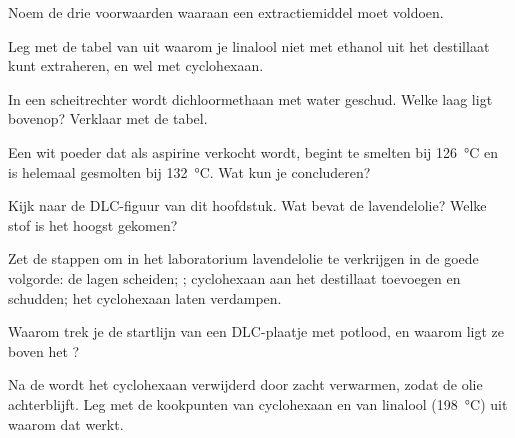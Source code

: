 \begin{exercise}[$\star$]\label{exo:g10:chemical-species:5}
Noem de drie voorwaarden waaraan een extractiemiddel moet voldoen.
\end{exercise}

\begin{exercise}[$\star\star$]\label{exo:g10:chemical-species:6}
Leg met de tabel van  uit waarom je linalool niet met
ethanol uit het destillaat kunt extraheren, en wel met cyclohexaan.
\end{exercise}

\begin{exercise}[$\star\star$]\label{exo:g10:chemical-species:7}
In een scheitrechter wordt dichloormethaan met water geschud. Welke laag
ligt bovenop? Verklaar met de tabel.
\end{exercise}

\begin{exercise}[$\star\star$]\label{exo:g10:chemical-species:8}
Een wit poeder dat als aspirine verkocht wordt, begint te smelten bij
\qty{126}{\celsius} en is helemaal gesmolten bij \qty{132}{\celsius}.
Wat kun je concluderen?
\end{exercise}

\begin{exercise}[$\star\star$]\label{exo:g10:chemical-species:9}
Kijk naar de DLC-figuur van dit hoofdstuk. Wat bevat de lavendelolie?
Welke stof is het hoogst gekomen?
\end{exercise}

\begin{exercise}[$\star\star$]\label{exo:g10:chemical-species:10}
Zet de stappen om in het laboratorium lavendelolie te verkrijgen in de
goede volgorde: de lagen scheiden; ; cyclohexaan aan het
destillaat toevoegen en schudden; het cyclohexaan laten verdampen.
\end{exercise}

\begin{exercise}[$\star\star$]\label{exo:g10:chemical-species:11}
Waarom trek je de startlijn van een DLC-plaatje met potlood, en waarom
ligt ze boven het ?
\end{exercise}

\begin{exercise}[$\star\star\star$]\label{exo:g10:chemical-species:12}
Na de  wordt het cyclohexaan verwijderd door zacht verwarmen,
zodat de olie achterblijft. Leg met de kookpunten van cyclohexaan en van
linalool (\qty{198}{\celsius}) uit waarom dat werkt.
\end{exercise}

